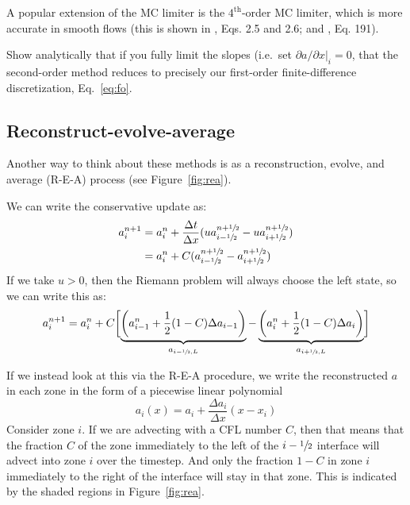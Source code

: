 A popular extension of the MC limiter is the $4^\mathrm{th}$-order MC
limiter, which is more accurate in smooth flows (this is shown in
\cite{colella:1985}, Eqs. 2.5 and 2.6; and \cite{colella:1990},
Eq. 191).

\begin{exercise}
{Show analytically that if you fully limit the slopes
  (i.e.\ set $\partial a/\partial x |_i = 0$, that the second-order
  method reduces to precisely our first-order finite-difference discretization,
  Eq.~\ref{eq:fo}.  }
\end{exercise}


\subsection{Reconstruct-evolve-average}

Another way to think about these methods is as a reconstruction,
evolve, and average (R-E-A) process (see Figure~\ref{fig:rea}).  

We can write the conservative update as:
\begin{align}
a_i^{n+1} &= a_i^n + \frac{\Delta t}{\Delta x} 
    (u a^{n+\sfrac{1}{2}}_{i-\sfrac{1}{2}} - u a^{n+\sfrac{1}{2}}_{i+\sfrac{1}{2}} ) \\
          &= a_i^n + C (a^{n+\sfrac{1}{2}}_{i-\sfrac{1}{2}} - a^{n+\sfrac{1}{2}}_{i+\sfrac{1}{2}} ) 
\end{align}
If we take $u > 0$, then the Riemann problem will always choose the
left state, so we can write this as:
\begin{equation}
a_i^{n+1} = a_i^n + 
     C \biggl [\underbrace{\left (a_{i-1}^n + \frac{1}{2} (1-C) \Delta a_{i-1} \right )}_{a_{i-\sfrac{1}{2},L}} -
              \underbrace{\left (a_{i}^n + \frac{1}{2} (1-C) \Delta a_{i} \right )}_{a_{i+\sfrac{1}{2},L}}
       \biggr ] \label{eq:rea_orig}
\end{equation}

If we instead look at this via the R-E-A procedure, we write the reconstructed
$a$ in each zone in the form of a piecewise linear polynomial
\begin{equation}
a_i(x) = a_i + \frac{\Delta a_i}{\Delta x} (x - x_i)
\end{equation}
Consider zone $i$.  
If we are advecting with a CFL number $C$, then that means that the fraction
$C$ of the zone immediately to the left of the $i-\sfrac{1}{2}$ interface will advect
into zone $i$ over the timestep.  And only the fraction $1-C$ in zone $i$
immediately to the right of the interface will stay in that zone.  This 
is indicated by the shaded regions in Figure~\ref{fig:rea}. 

